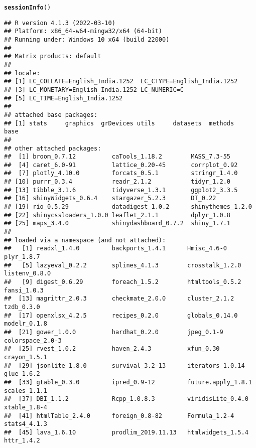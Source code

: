 \documentclass{article}\usepackage[]{graphicx}\usepackage[]{color}
\makeatletter
\newcommand{\hlstd}[1]{\textcolor[rgb]{0.345,0.345,0.345}{#1}}%
\newcommand{\hlkwd}[1]{\textcolor[rgb]{0.737,0.353,0.396}{\textbf{#1}}}%
\newenvironment{kframe}{%
 \def\at@end@of@kframe{}%
 \ifinner\ifhmode%
  \def\at@end@of@kframe{\end{minipage}}%
  \begin{minipage}{\columnwidth}%
 \fi\fi%
 \def\FrameCommand##1{\hskip\@totalleftmargin \hskip-\fboxsep
 \colorbox{shadecolor}{##1}\hskip-\fboxsep
     \hskip-\linewidth \hskip-\@totalleftmargin \hskip\columnwidth}%
 \MakeFramed {\advance\hsize-\width
   \@totalleftmargin\z@ \linewidth\hsize
   \@setminipage}}%
 {\par\unskip\endMakeFramed%
 \at@end@of@kframe}
\newenvironment{knitrout}{}{} %
\makeatother
\begin{document}
\begin{knitrout}
\color{fgcolor}\begin{kframe}
\begin{alltt}
\hlkwd{sessionInfo}\hlstd{()}
\end{alltt}
\begin{verbatim}
## R version 4.1.3 (2022-03-10)
## Platform: x86_64-w64-mingw32/x64 (64-bit)
## Running under: Windows 10 x64 (build 22000)
## 
## Matrix products: default
## 
## locale:
## [1] LC_COLLATE=English_India.1252  LC_CTYPE=English_India.1252   
## [3] LC_MONETARY=English_India.1252 LC_NUMERIC=C                  
## [5] LC_TIME=English_India.1252    
## 
## attached base packages:
## [1] stats     graphics  grDevices utils     datasets  methods   base     
## 
## other attached packages:
##  [1] broom_0.7.12          caTools_1.18.2        MASS_7.3-55          
##  [4] caret_6.0-91          lattice_0.20-45       corrplot_0.92        
##  [7] plotly_4.10.0         forcats_0.5.1         stringr_1.4.0        
## [10] purrr_0.3.4           readr_2.1.2           tidyr_1.2.0          
## [13] tibble_3.1.6          tidyverse_1.3.1       ggplot2_3.3.5        
## [16] shinyWidgets_0.6.4    stargazer_5.2.3       DT_0.22              
## [19] rio_0.5.29            datadigest_1.0.2      shinythemes_1.2.0    
## [22] shinycssloaders_1.0.0 leaflet_2.1.1         dplyr_1.0.8          
## [25] maps_3.4.0            shinydashboard_0.7.2  shiny_1.7.1          
## 
## loaded via a namespace (and not attached):
##   [1] readxl_1.4.0         backports_1.4.1      Hmisc_4.6-0          plyr_1.8.7          
##   [5] lazyeval_0.2.2       splines_4.1.3        crosstalk_1.2.0      listenv_0.8.0       
##   [9] digest_0.6.29        foreach_1.5.2        htmltools_0.5.2      fansi_1.0.3         
##  [13] magrittr_2.0.3       checkmate_2.0.0      cluster_2.1.2        tzdb_0.3.0          
##  [17] openxlsx_4.2.5       recipes_0.2.0        globals_0.14.0       modelr_0.1.8        
##  [21] gower_1.0.0          hardhat_0.2.0        jpeg_0.1-9           colorspace_2.0-3    
##  [25] rvest_1.0.2          haven_2.4.3          xfun_0.30            crayon_1.5.1        
##  [29] jsonlite_1.8.0       survival_3.2-13      iterators_1.0.14     glue_1.6.2          
##  [33] gtable_0.3.0         ipred_0.9-12         future.apply_1.8.1   scales_1.1.1        
##  [37] DBI_1.1.2            Rcpp_1.0.8.3         viridisLite_0.4.0    xtable_1.8-4        
##  [41] htmlTable_2.4.0      foreign_0.8-82       Formula_1.2-4        stats4_4.1.3        
##  [45] lava_1.6.10          prodlim_2019.11.13   htmlwidgets_1.5.4    httr_1.4.2          

\end{verbatim}
\end{kframe}
\end{knitrout}
\end{document}
